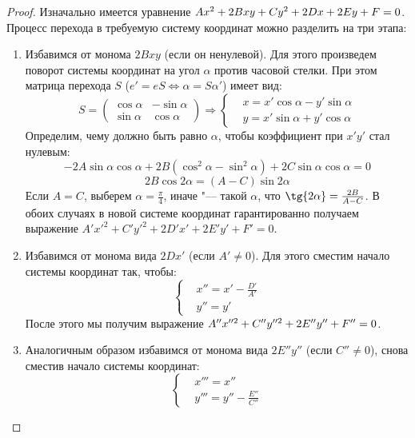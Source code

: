 \begin{proof}
	Изначально имеется уравнение $Ax^2 + 2Bxy + Cy^2 \hm{+} 2Dx + 2Ey + F = 0$. Процесс перехода в требуемую систему координат можно разделить на три этапа:
	\begin{enumerate}
		\item Избавимся от монома $2Bxy$ (если он ненулевой). Для этого произведем поворот системы координат на угол $\alpha$ против часовой стелки. При этом матрица перехода $S$ ($e' = eS \Leftrightarrow \alpha = S\alpha'$) имеет вид:
		\[S = \begin{pmatrix}\cos{\alpha}&-\sin{\alpha}\\\sin{\alpha}&\cos{\alpha}\end{pmatrix} \Rightarrow \left\{\begin{aligned}
		&x = x'\cos{\alpha}-y'\sin{\alpha}\\
		&y = x'\sin{\alpha}+y'\cos{\alpha}
		\end{aligned}\right.\]
		Определим, чему должно быть равно $\alpha$, чтобы коэффициент при $x'y'$ стал нулевым:
		\[-2A\sin{\alpha}\cos{\alpha} + 2B(\cos^2{\alpha} - \sin^2{\alpha}) + 2C\sin{\alpha}\cos{\alpha} = 0\]
		\[2B\cos{2\alpha} = (A - C)\sin{2\alpha}\]
		Если $A = C$, выберем $\alpha = \frac{\pi}{4}$, иначе "--- такой $\alpha$, что $\tg{2\alpha} = \frac{2B}{A - C}$. В обоих случаях в новой системе координат гарантированно получаем выражение $A'x'^2 + C'y'^2 + 2D'x' +2E'y' + F' = 0$.
		\item Избавимся от монома вида $2Dx'$ (если $A' \ne 0$). Для этого сместим начало системы координат так, чтобы:
		\[\left\{\begin{aligned}
		&x'' = x' - \frac{D'}{A'}\\
		&y'' = y'
		\end{aligned}\right.\]
		После этого мы получим выражение $A''x''^2+C''y''^2+2E''y'' \hm{+} F'' = 0$.
		\item Аналогичным образом избавимся от монома вида $2E''y''$ (если $C'' \ne 0$), снова сместив начало системы координат:
		\[\left\{\begin{aligned}
		&x''' = x''\\
		&y''' = y'' - \frac{E''}{C''}\end{aligned}\right.\]
	\end{enumerate}
	

\end{proof}

